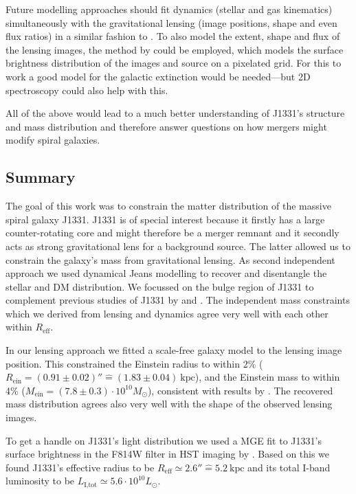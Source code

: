 \documentclass[useAMS,usenatbib]{mnras}
\begin{document}
Future modelling approaches should fit dynamics (stellar and gas kinematics) simultaneously with the gravitational lensing (image positions, shape and even flux ratios) in a similar fashion to \citet{SWELLSIV}. To also model the extent, shape and flux of the lensing images, the method by \citet{2004ApJ...611..739T,2003ApJ...590..673W} could be employed, which models the surface brightness distribution of the images and source on a pixelated grid. For this to work a good model for the galactic extinction would be needed---but 2D spectroscopy could also help with this.

All of the above would lead to a much better understanding of J1331's structure and mass distribution and therefore answer questions on how mergers might modify spiral galaxies.

\subsection{Summary}

The goal of this work was to constrain the matter distribution of the massive spiral galaxy J1331. J1331 is of special interest because it firstly has a large counter-rotating core and might therefore be a merger remnant and it secondly acts as strong gravitational lens for a background source. The latter allowed us to constrain the galaxy's mass from gravitational lensing. As second independent approach we used dynamical Jeans modelling to recover and disentangle the stellar and DM distribution. We focussed on the bulge region of J1331 to complement previous studies of J1331 by \citet{SWELLSIII} and \citet{SWELLSV}. The independent mass constraints which we derived from lensing and dynamics agree very well with each other within $R_\text{eff}$.

In our lensing approach we fitted a scale-free galaxy model to the lensing image position. This constrained the Einstein radius to within 2\% ($R_\text{ein}=(0.91\pm0.02)'' \hat{=}(1.83\pm0.04)~\text{kpc}$), and the Einstein mass to within 4\% ($M_\text{ein} = (7.8\pm0.3) \cdot 10^{10} M_\odot$), consistent with results by \citet{SWELLSIII}. The recovered mass distribution agrees also very well with the shape of the observed lensing images.

To get a handle on J1331's light distribution we used a MGE fit to J1331's surface brightness in the F814W filter in HST imaging by \citet{SWELLSI}. Based on this we found J1331's effective radius to be $R_\text{eff} \simeq 2.6'' \hat{=} 5.2~\text{kpc}$ and its total I-band luminosity to be $L_\text{I,tot} \simeq 5.6 \cdot 10^{10} L_\odot$.
\end{document}

